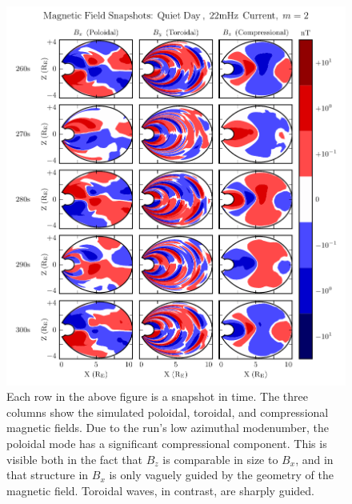 \begin{figure}[!htb]
  \centering
  \includegraphics[width=\textwidth]{figures/snapshot_smallm.pdf}
  \caption[Magnetic Field Snapshots from a Small-\azm Run]{
    Each row in the above figure is a snapshot in time. The three columns show
    the simulated poloidal, toroidal, and compressional magnetic fields. Due to
    the run's low azimuthal modenumber, the poloidal mode has a significant
    compressional component. This is visible both in the fact that $B_z$ is
    comparable in size to $B_x$, and in that structure in $B_x$ is only vaguely
    guided by the geometry of the magnetic field. Toroidal waves, in contrast,
    are sharply guided. 
  }
  \label{fig_snapshot_smallm}
\end{figure}

